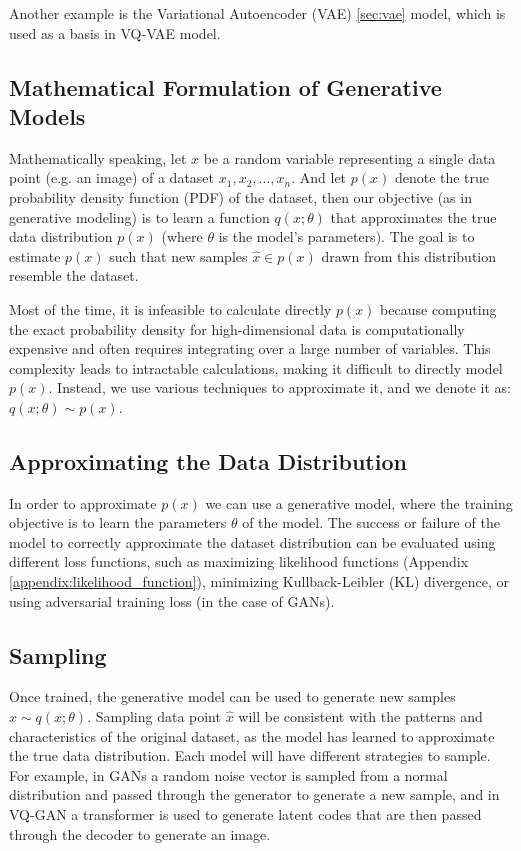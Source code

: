 Another example is the Variational Autoencoder (VAE) \cite{vae} \ref{sec:vae} model, which is used as a basis in VQ-VAE model. 



\subsection{Mathematical Formulation of Generative Models}
Mathematically speaking, let $x$ be a random variable representing a single data point (e.g. an image) of a dataset ${x_1,x_2,...,x_n}$. And let $p(x)$ denote the true probability density function (PDF) of the dataset, then our objective (as in generative modeling) is to learn a function $q(x;\theta)$ that approximates the true data distribution $p(x)$ (where $\theta$ is the model's parameters). The goal is to estimate $p(x)$ such that new samples $\hat{x} \in p(x)$ drawn from this distribution resemble the dataset.

Most of the time, it is infeasible to calculate directly $p(x)$ because computing the exact probability density for high-dimensional data is computationally expensive and often requires integrating over a large number of variables. This complexity leads to intractable calculations, making it difficult to directly model $p(x)$. Instead, we use various techniques to approximate it, and we denote it as: $q(x;\theta) \sim p(x)$.

\subsection{Approximating the Data Distribution}

In order to approximate $p(x)$ we can use a generative model, where the training objective is to learn the parameters $\theta$ of the model. The success or failure of the model to correctly approximate the dataset distribution can be evaluated using different loss functions, such as maximizing likelihood functions (Appendix \ref{appendix:likelihood_function}), minimizing Kullback-Leibler (KL) divergence, or using adversarial training loss (in the case of GANs).

\subsection{Sampling}

Once trained, the generative model can be used to generate new samples $\hat{x} \sim q(x;\theta)$. Sampling data point $\hat{x}$ will be consistent with the patterns and characteristics of the original dataset, as the model has learned to approximate the true data distribution. Each model will have different strategies to sample. For example, in GANs a random noise vector is sampled from a normal distribution and passed through the generator to generate a new sample, and in VQ-GAN a transformer is used to generate latent codes that are then passed through the decoder to generate an image.

